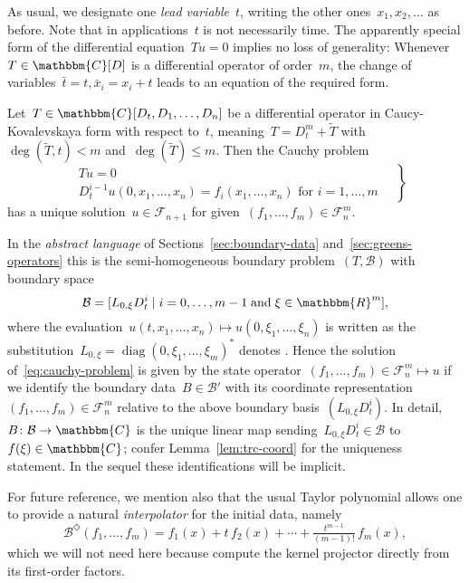 \documentclass[a4paper]{llncs}
\let\mathbb\mathbbm
\newcommand{\RR}{\mathbb{R}}
\newcommand{\CC}{\mathbb{C}}
\newcommand{\diag}{\operatorname{diag}}
\newcommand{\fri}[1]{#1^\Diamond}
\newcommand{\galg}{\mathcal{F}}
\newcommand{\func}[2]{\galg^{#1}_{#2}}
\newcommand{\bspc}{\mathcal{B}}
\begin{document}
As usual, we designate one \emph{lead variable}~$t$, writing the other
ones~$x_1, x_2, \dots$ as before. Note that in applications~$t$ is not
necessarily time. The apparently special form of the differential
equation~$Tu=0$ implies no loss of generality: Whenever~$T \in \CC[D]$ is a
differential operator of order~$m$, the change of variables~$\bar{t} = t,
\bar{x}_i = x_i + t$ leads to an equation of the required form.

\begin{theorem}
  \label{thm:global-kovalevskaya}
  Let~$T \in \CC[D_t, D_1, \dots, D_n]$ be a differential operator in
  Caucy-Kovalevskaya form with respect to~$t$, meaning~$T = D_t^m + \tilde{T}$
  with~$\deg(\tilde{T}, t) < m$ and~$\deg(\tilde{T}) \le m$. Then the Cauchy
  problem
\begin{equation}
    \label{eq:cauchy-problem}
    \left.
    \begin{aligned}
      &Tu = 0\\
      &D_t^{i-1}u(0,x_1, \dots, x_n) = f_{i}(x_1, \dots, x_n) \text{ for $i=1,
        \dots, m$}
    \end{aligned}
    \quad\right\}
  \end{equation}
has a unique solution~$u \in \func{}{n+1}$ for given~$(f_1, \dots, f_m) \in
  \func{m}{n}$.
\end{theorem}

In the \emph{abstract language} of Sections~\ref{sec:boundary-data}
and~\ref{sec:greens-operators} this is the semi-homogeneous boundary
problem~$(T, \bspc)$ with boundary space
\begin{equation*}
  \bspc = [L_{0,\xi} D_t^i \mid i = 0, \dots, m-1 \;\text{and}\; \xi \in \RR^m],
\end{equation*}
where the evaluation~$u(t, x_1, \dots, x_n) \mapsto u(0, \xi_1, \dots, \xi_n)$
is written as the substitution~$L_{0,\xi} = \diag(0, \xi_1, \dots, \xi_m)^*$
denotes . Hence the solution of~\eqref{eq:cauchy-problem} is given by the state
operator~$(f_1, \dots, f_m) \in \func{m}{n} \mapsto u$ if we identify the
boundary data~$B \in \bspc'$ with its coordinate representation~$(f_1, \dots,
f_m) \in \func{m}{n}$ relative to the above boundary basis~$(L_{0,\xi}
D_t^i)$. In detail, $B\colon \bspc \to \CC$ is the unique linear map
sending~$L_{0, \xi} D_t^i \in \bspc$ to~$f(\xi) \in \CC$; confer
Lemma~\ref{lem:trc-coord} for the uniqueness statement. In the sequel these
identifications will be implicit.

For future reference, we mention also that the usual Taylor polynomial allows
one to provide a natural \emph{interpolator} for the initial data,
namely
\begin{equation}
  \label{eq:fund-intp}
  \fri{\bspc}(f_1, \dots, f_m) = f_1(x) + t \, f_2(x) + \cdots +
  \tfrac{t^{m-1}}{(m-1)!} \, f_m(x),
\end{equation}
which we will not need here because compute the kernel projector directly from
its first-order factors.
\end{document}
